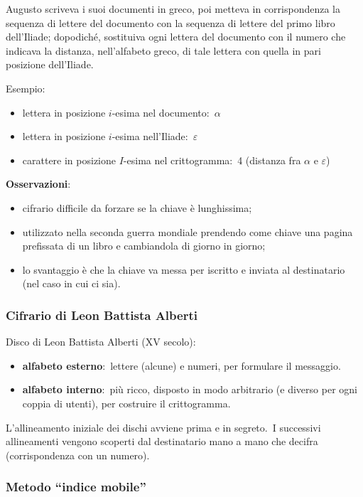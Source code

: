 Augusto scriveva i suoi documenti in greco, poi metteva in corrispondenza la sequenza di lettere del documento con la sequenza di lettere del primo libro dell'Iliade; dopodiché, sostituiva ogni lettera del documento con il numero che indicava la distanza, nell'alfabeto greco, di tale lettera con quella in pari posizione dell'Iliade.\

\vspace{12pt}
\noindent Esempio:
\begin{itemize}
    \item lettera in posizione $i$-esima nel documento:\ $\alpha$
    \item lettera in posizione $i$-esima nell'Iliade:\ $\varepsilon$
    \item carattere in posizione $I$-esima nel crittogramma:\ 4 (distanza fra $\alpha$ e $\varepsilon$)
\end{itemize}

\noindent\textbf{Osservazioni}:
\begin{itemize}
    \item cifrario difficile da forzare se la chiave è lunghissima;
    \item utilizzato nella seconda guerra mondiale prendendo come chiave una pagina prefissata di un libro e cambiandola di giorno in giorno;
    \item lo svantaggio è che la chiave va messa per iscritto e inviata al destinatario (nel caso in cui ci sia).
\end{itemize}

\subsubsection{Cifrario di Leon Battista Alberti}

Disco di Leon Battista Alberti (XV secolo):\
\begin{itemize}
    \item \textbf{alfabeto esterno}:\ lettere (alcune) e numeri, per formulare il messaggio.
    \item \textbf{alfabeto interno}:\ più ricco, disposto in modo arbitrario (e diverso per ogni coppia di utenti), per costruire il crittogramma.
\end{itemize}

\noindent L'allineamento iniziale dei dischi avviene prima e in segreto.\
I successivi allineamenti vengono scoperti dal destinatario mano a mano che decifra (corrispondenza con un numero).

\subsubsection{Metodo ``indice mobile''}

